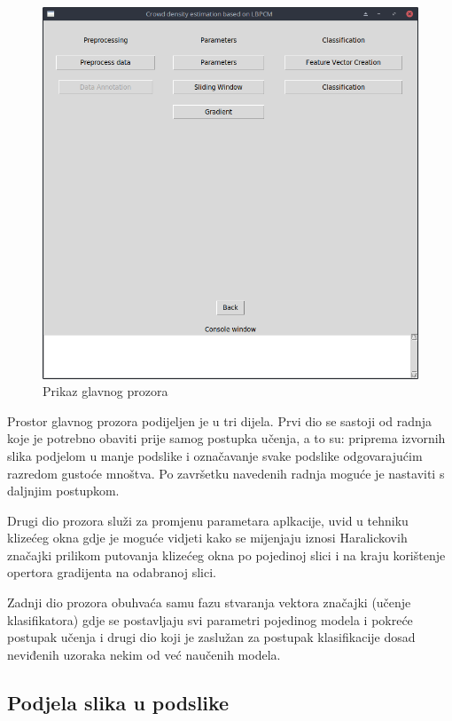 \documentclass[times, utf8, zavrsni]{fer}
\begin{document}
\begin{figure}[ht]
\centering
\includegraphics[scale=0.4]{img/mainscreen.png}
\caption{Prikaz glavnog prozora}
\end{figure}

Prostor glavnog prozora podijeljen je u tri dijela. Prvi dio se sastoji
od radnja koje je potrebno obaviti prije samog postupka učenja, a to su:
priprema izvornih slika podjelom u manje podslike i označavanje svake 
podslike odgovarajućim razredom gustoće mnoštva. Po završetku navedenih radnja
moguće je nastaviti s daljnjim postupkom.

\bigbreak

Drugi dio prozora služi za promjenu parametara aplkacije, uvid u tehniku 
klizećeg okna gdje je moguće vidjeti kako se mijenjaju iznosi Haralickovih značajki
prilikom putovanja klizećeg okna po pojedinoj slici i na kraju korištenje
opertora gradijenta na odabranoj slici.

\newpage

Zadnji dio prozora obuhvaća samu fazu stvaranja vektora značajki (učenje
klasifikatora) gdje se postavljaju svi parametri pojedinog modela i pokreće
postupak učenja i drugi dio koji je zaslužan za postupak klasifikacije
dosad neviđenih uzoraka nekim od već naučenih modela.


\subsection{Podjela slika u podslike}
\end{document}
